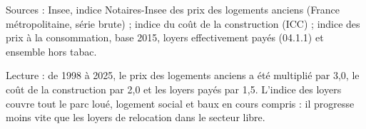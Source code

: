 Sources : Insee, indice Notaires-Insee des prix des logements anciens (France métropolitaine, série brute) ; indice du coût de la construction (ICC) ; indice des prix à la consommation, base 2015, loyers effectivement payés (04.1.1) et ensemble hors tabac.\par Lecture : de 1998 à 2025, le prix des logements anciens a été multiplié par 3,0, le coût de la construction par 2,0 et les loyers payés par 1,5. L'indice des loyers couvre tout le parc loué, logement social et baux en cours compris : il progresse moins vite que les loyers de relocation dans le secteur libre.
